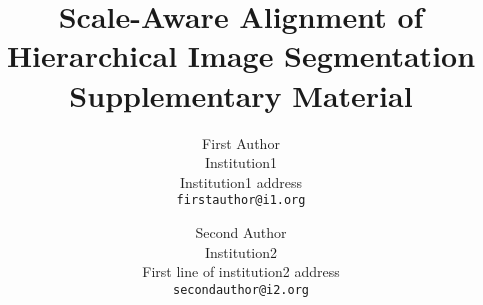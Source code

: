 \documentclass[10pt,twocolumn,letterpaper]{article}
\begin{document}
\title{Scale-Aware Alignment of Hierarchical Image Segmentation\\ \vspace{0.5cm} Supplementary Material}

\author{First Author\\
Institution1\\
Institution1 address\\
{\tt\small firstauthor@i1.org}
\and
Second Author\\
Institution2\\
First line of institution2 address\\
{\tt\small secondauthor@i2.org}
}

\maketitle


\end{document}
